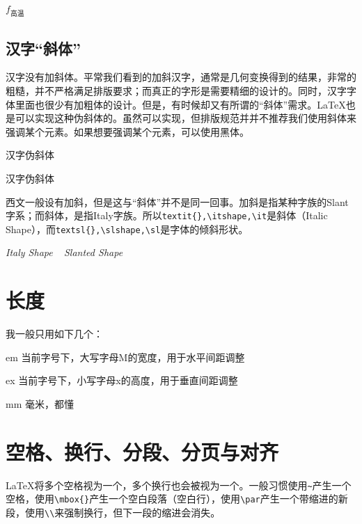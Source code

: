 \begin{codeshow}
$f_{\text{高温}}$
\end{codeshow}

\subsection{汉字“斜体”}
汉字没有加斜体。平常我们看到的加斜汉字，通常是几何变换得到的结果，非常的粗糙，并不严格满足排版要求；而真正的字形是需要精细的设计的。同时，汉字字体里面也很少有加粗体的设计。但是，有时候却又有所谓的“斜体”需求。\LaTeX 也是可以实现这种伪斜体的。虽然可以实现，但排版规范并并不推荐我们使用斜体来强调某个元素。如果想要强调某个元素，可以使用{\heiti 黑体}。

\begin{center}
	{汉字伪斜体}
\end{center}

\begin{latex}{}
{汉字伪斜体}
\end{latex}

西文一般设有加斜，但是这与“斜体”并不是同一回事。加斜是指某种字族的Slant字系；而斜体，是指Italy字族。所以\verb|textit{},\itshape,\it|是斜体（Italic Shape），而\verb|textsl{},\slshape,\sl|是字体的倾斜形状。

\begin{center}
	{ \textit{Italy Shape} ~ \textsl{Slanted Shape}}
\end{center}

\section{长度}

我一般只用如下几个：

\begin{asparadesc}
	\item[em] 当前字号下，大写字母M的宽度，用于水平间距调整
	\item[ex] 当前字号下，小写字母x的高度，用于垂直间距调整
	\item[mm] 毫米，都懂
\end{asparadesc}



\section{空格、换行、分段、分页与对齐}

\LaTeX 将多个空格视为一个，多个换行也会被视为一个。一般习惯使用\verb|~|产生一个空格，使用\verb|\mbox{}|产生一个空白段落（空白行），使用\verb|\par|产生一个带缩进的新段，使用\verb|\\|来强制换行，但下一段的缩进会消失。

